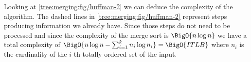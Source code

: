Looking at \ref{tree:merging:fig/huffman-2} we can deduce the complexity of the
algorithm. The dashed lines in \ref{tree:merging:fig/huffman-2} represent steps
producing information we already have. Since those steps do not need to be
processed and since the complexity of the merge sort is $\BigO{n \log n}$ we
have a total complexity of $\BigO{n \log n - \sum_{i=1}^{k} n_i \log n_i} =
\BigO{ITLB}$ where $n_i$ is the cardinality of the $i$-th totally ordered set
of the input.

